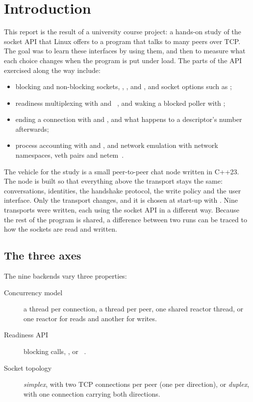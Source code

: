 \section{Introduction}

This report is the result of a university course project: a hands-on study of the
socket API that Linux offers to a program that talks to many peers over TCP. The
goal was to learn these interfaces by using them, and then to measure what each
choice changes when the program is put under load. The parts of the API exercised
along the way include:
\begin{itemize}
  \item blocking and non-blocking sockets, , ,
         and , and socket options such as ;
  \item readiness multiplexing with  and ~\cite{poll},
        and waking a blocked poller with ;
  \item ending a connection with  and , and what happens to
        a descriptor's number afterwards;
  \item process accounting with  and , and network
        emulation with network namespaces, veth pairs and netem~\cite{netem}.
\end{itemize}

The vehicle for the study is a small peer-to-peer chat node written in C++23. The
node is built so that everything above the transport stays the same: conversations,
identities, the handshake protocol, the write policy and the user interface. Only
the transport changes, and it is chosen at start-up with . Nine
transports were written, each using the socket API in a different way. Because the
rest of the program is shared, a difference between two runs can be traced to how
the sockets are read and written.

\subsection{The three axes}

The nine backends vary three properties:
\begin{description}
  \item[Concurrency model] a thread per connection, a thread per peer, one shared
        reactor thread, or one reactor for reads and another for writes.
  \item[Readiness API] blocking calls, , or ~\cite{poll}.
  \item[Socket topology] \emph{simplex}, with two TCP connections per peer (one per
        direction), or \emph{duplex}, with one connection carrying both directions.
\end{description}

